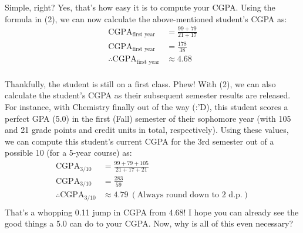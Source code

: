 \documentclass[letter]{article}
\begin{document}
Simple, right? Yes, that's how easy it is to compute your CGPA. Using the formula in (2), we can now calculate the above-mentioned student's CGPA as:
\begin{align*}
	\text{CGPA}_{\text{first year}}            & = \frac{99+79}{21+17} \\
	\text{CGPA}_{\text{first year}}            & = \frac{178}{38}      \\
	\therefore \text{CGPA}_{\text{first year}} & \approx 4.68          \\
\end{align*}

Thankfully, the student is still on a first class. Phew! With (2), we can also calculate the student's CGPA as their subsequent semester results are released. For instance, with Chemistry finally out of the way (:'D), this student scores a perfect GPA (5.0) in the first (Fall) semester of their sophomore year (with 105 and 21 grade points and credit units in total, respectively). Using these values, we can compute this student's current CGPA for the 3rd semester out of a possible 10 (for a 5-year course) as:
\begin{align*}
	\text{CGPA}_{\text{3/10}}            & = \frac{99+79+105}{21+17+21}                        \\
	\text{CGPA}_{\text{3/10}}            & = \frac{283}{59}                                    \\
	\therefore \text{CGPA}_{\text{3/10}} & \approx 4.79 \ (\text{Always round down to 2 d.p.}) \\
\end{align*}
That's a whopping 0.11 jump in CGPA from 4.68! I hope you can already see the good things a 5.0 can do to your CGPA. Now, why is all of this even necessary?
\end{document}
